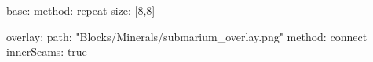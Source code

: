 base:
  method: repeat
  size: [8,8]

overlay:
  path: "Blocks/Minerals/submarium_overlay.png"
  method: connect
  innerSeams: true
